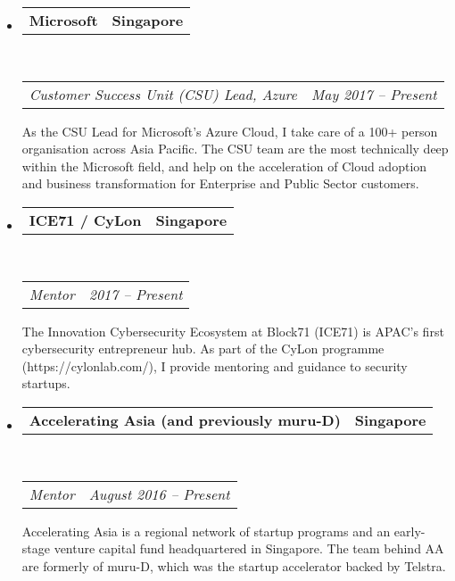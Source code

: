 \documentclass[10pt,a4paper]{article}
\makeatletter
\newcommand{\headerrow}[2]
{\begin{tabular*}{\linewidth}{l@{\extracolsep{\fill}}r}
    #1 &
    #2 \\
\end{tabular*}}
\makeatother
\begin{document}
\begin{itemize}
    \parskip=0.1em

    \item
        \headerrow
            {\textbf{Microsoft}}
            {\textbf{Singapore}}
        \\
        \headerrow
            {\emph{Customer Success Unit (CSU) Lead, Azure}}
            {\emph{May 2017 -- Present}}
            
            As the CSU Lead for Microsoft's Azure Cloud, I take care of a 100+ person organisation across Asia Pacific. The CSU team are the most technically deep within the Microsoft field, and help on the acceleration of Cloud adoption and business transformation for Enterprise and Public Sector customers.
            

    \item
            \headerrow
                {\textbf{ICE71 / CyLon}}
                {\textbf{Singapore}}
            \\
            \headerrow
                {\emph{Mentor}}
                {\emph{2017 -- Present}}

                The Innovation Cybersecurity Ecosystem at Block71 (ICE71) is APAC's first cybersecurity entrepreneur hub. As part of the CyLon programme (https://cylonlab.com/), I provide mentoring and guidance to security startups.

    \item
        \headerrow
            {\textbf{Accelerating Asia (and previously muru-D)}}
            {\textbf{Singapore}}
        \\
        \headerrow
            {\emph{Mentor}}
            {\emph{August 2016 -- Present}}

            Accelerating Asia is a regional network of startup programs and an early-stage venture capital fund headquartered in Singapore. The team behind AA are formerly of muru-D, which was the startup accelerator backed by Telstra.
            \\


\end{itemize}
\end{document}
